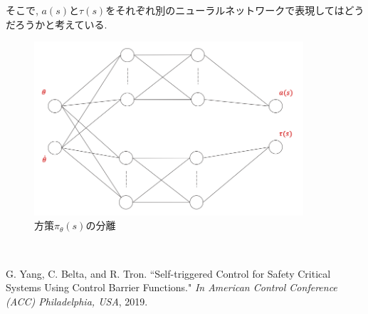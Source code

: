 \documentclass{jsarticle}
\begin{document}
そこで, $a(s)と\tau(s)$をそれぞれ別のニューラルネットワークで表現してはどうだろうかと考えている.
\begin{figure}[h]
	\centering
 	\includegraphics[width=10cm]{split_NN.png}
 	\caption{方策$\pi_{\theta}(s)$の分離}  \label{split_NN}
\end{figure}\\

\newpage


\begin{thebibliography}{10}
G. Yang, C. Belta, and R. Tron. “Self-triggered Control for Safety Critical Systems Using Control Barrier Functions."  \textit{In American Control Conference (ACC) Philadelphia, USA}, 2019.
 
 \end{thebibliography}
\end{document}
